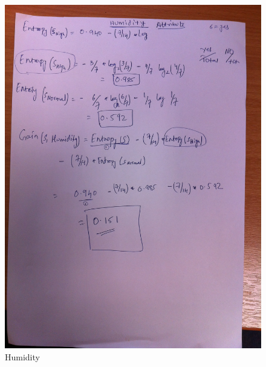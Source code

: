 \documentclass{article}
\begin{document}
\begin{figure}[hbtp]
\centering
\includegraphics[scale=0.2]{IMG_0735.JPG}
\caption{Humidity}
\end{figure}

\newpage
\end{document}
